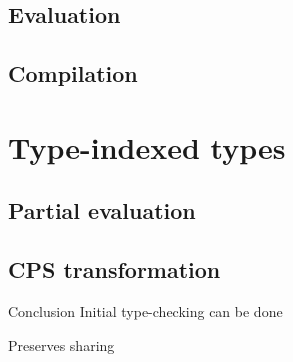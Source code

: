 \documentclass[ucs,professionalfont]{beamer}
\begin{document}
\subsection{Evaluation}
\subsection{Compilation}
\section{Type-indexed types}
\subsection{Partial evaluation}
\subsection{CPS transformation}

\begin{frame}{Conclusion}
    Initial type-checking can be done

    Preserves sharing
\end{frame}
\end{document}
